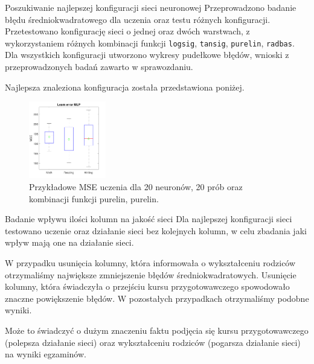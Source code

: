\documentclass[10pt]{beamer}
\begin{document}
\begin{frame}[fragile]{Poszukiwanie najlepszej konfiguracji sieci neuronowej}
Przeprowadzono badanie błędu średniokwadratowego dla uczenia oraz testu różnych konfiguracji. Przetestowano konfigurację sieci o jednej oraz dwóch warstwach, z wykorzystaniem różnych kombinacji funkcji \verb+logsig+, \verb+tansig+, \verb+purelin+, \verb+radbas+. Dla wszystkich konfiguracji utworzono wykresy pudełkowe błędów, wnioski z przeprowadzonych badań zawarto w sprawozdaniu.

Najlepsza znaleziona konfiguracja została przedstawiona poniżej.

\begin{figure}[H]
\centering
\includegraphics[width=0.3\textwidth]{../report/static/purelin_purelin_20_learnBoxplot.pdf}
\caption{Przykładowe MSE uczenia dla 20 neuronów, 20 prób oraz kombinacji funkcji purelin, purelin.}
\end{figure}

\end{frame}

\begin{frame}[fragile]{Badanie wpływu ilości kolumn na jakość sieci}
Dla najlepszej konfiguracji sieci testowano uczenie oraz działanie sieci bez kolejnych kolumn, w celu zbadania jaki wpływ mają one na działanie sieci.

W przypadku usunięcia  kolumny, która informowała o wykształceniu rodziców otrzymaliśmy największe zmniejszenie błędów średniokwadratowych. Usunięcie  kolumny, która świadczyła o przejściu kursu przygotowawczego spowodowało znaczne powiększenie błędów. W pozostałych przypadkach otrzymaliśmy podobne wyniki. 

Może to świadczyć o dużym znaczeniu faktu podjęcia się kursu przygotowawczego (polepsza działanie sieci) oraz wykształceniu rodziców (pogarsza działanie sieci) na wyniki egzaminów.

\end{frame}
\end{document}
